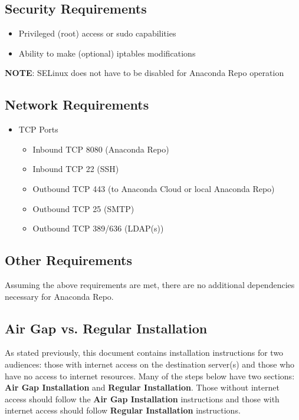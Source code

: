 \documentclass[letterpaper,10pt,openany,oneside]{sphinxmanual}
\begin{document}
\subsection{Security Requirements}
\label{AnacondaRepository:security-requirements}\begin{itemize}
\item {} 
Privileged (root) access or sudo capabilities

\item {} 
Ability to make (optional) iptables modifications

\end{itemize}

\textbf{NOTE}: SELinux does not have to be disabled for Anaconda Repo
operation


\subsection{Network Requirements}
\label{AnacondaRepository:network-requirements}\begin{itemize}
\item {} 
TCP Ports
\begin{itemize}
\item {} 
Inbound TCP 8080 (Anaconda Repo)

\item {} 
Inbound TCP 22 (SSH)

\item {} 
Outbound TCP 443 (to Anaconda Cloud or local Anaconda Repo)

\item {} 
Outbound TCP 25 (SMTP)

\item {} 
Outbound TCP 389/636 (LDAP(s))

\end{itemize}

\end{itemize}


\subsection{Other Requirements}
\label{AnacondaRepository:other-requirements}
Assuming the above requirements are met, there are no additional
dependencies necessary for Anaconda Repo.


\subsection{Air Gap vs. Regular Installation}
\label{AnacondaRepository:air-gap-vs-regular-installation}
As stated previously, this document contains installation instructions
for two audiences: those with internet access on the destination
server(s) and those who have no access to internet resources. Many of
the steps below have two sections: \textbf{Air Gap Installation} and
\textbf{Regular Installation}. Those without internet access should follow
the \textbf{Air Gap Installation} instructions and those with internet access
should follow \textbf{Regular Installation} instructions.
\end{document}
